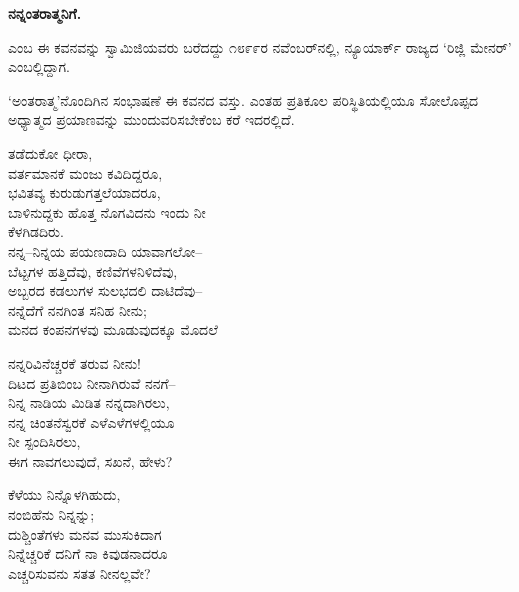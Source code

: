 \begin{myquote}
\end{myquote}

\selectkan

\begin{center}
\textbf{ನನ್ನಂತರಾತ್ಮನಿಗೆ.}
\end{center}

 ಎಂಬ ಈ ಕವನವನ್ನು ಸ್ವಾಮಿಜಿಯವರು ಬರೆದದ್ದು ೧೮೯೯ರ ನವೆಂಬರ್‌ನಲ್ಲಿ, ನ್ಯೂಯಾರ್ಕ್ ರಾಜ್ಯದ ‘ರಿಜ್ಲಿ ಮೇನರ್’ ಎಂಬಲ್ಲಿದ್ದಾಗ.

‘ಅಂತರಾತ್ಮ’ನೊಂದಿಗಿನ ಸಂಭಾಷಣೆ ಈ ಕವನದ ವಸ್ತು. ಎಂತಹ ಪ್ರತಿಕೂಲ ಪರಿಸ್ಥಿತಿಯಲ್ಲಿಯೂ ಸೋಲೊಪ್ಪದ ಅಧ್ಯಾತ್ಮದ ಪ್ರಯಾಣವನ್ನು ಮುಂದುವರಿಸಬೇಕೆಂಬ ಕರೆ ಇದರಲ್ಲಿದೆ.

\begin{myquote}
ತಡೆದುಕೋ ಧೀರಾ,\\ವರ್ತಮಾನಕೆ ಮಂಜು ಕವಿದಿದ್ದರೂ,\\ಭವಿತವ್ಯ ಕುರುಡುಗತ್ತಲೆಯಾದರೂ,\\ಬಾಳಿನುದ್ದಕು ಹೊತ್ತ ನೊಗವಿದನು ಇಂದು ನೀ\\ಕೆಳಗಿಡದಿರು.\\ನನ್ನ–ನಿನ್ನಯ ಪಯಣದಾದಿ ಯಾವಾಗಲೋ–\\ಬೆಟ್ಟಗಳ ಹತ್ತಿದೆವು, ಕಣಿವೆಗಳನಿಳಿದೆವು,\\ಅಬ್ಬರದ ಕಡಲುಗಳ ಸುಲಭದಲಿ ದಾಟಿದೆವು–\\ನನ್ನೆದೆಗೆ ನನಗಿಂತ ಸನಿಹ ನೀನು;\\ಮನದ ಕಂಪನಗಳವು ಮೂಡುವುದಕ್ಕೂ ಮೊದಲೆ
\end{myquote}

\begin{myquote}
ನನ್ನರಿವಿನೆಚ್ಚರಕೆ ತರುವ ನೀನು!\\ದಿಟದ ಪ್ರತಿಬಿಂಬ ನೀನಾಗಿರುವೆ ನನಗೆ–\\ನಿನ್ನ ನಾಡಿಯ ಮಿಡಿತ ನನ್ನದಾಗಿರಲು,\\ನನ್ನ ಚಿಂತನೆಸ್ವರಕೆ ಎಳೆಎಳೆಗಳಲ್ಲಿಯೂ\\ನೀ ಸ್ಪಂದಿಸಿರಲು,\\ಈಗ ನಾವಗಲುವುದೆ, ಸಖನೆ, ಹೇಳು?
\end{myquote}

\begin{myquote}
ಕೆಳೆಯು ನಿನ್ನೊಳಗಿಹುದು,\\ನಂಬಿಹೆನು ನಿನ್ನನ್ನು;\\ದುಶ್ಚಿಂತೆಗಳು ಮನವ ಮುಸುಕಿದಾಗ\\ನಿನ್ನೆಚ್ಚರಿಕೆ ದನಿಗೆ ನಾ ಕಿವುಡನಾದರೂ\\ಎಚ್ಚರಿಸುವನು ಸತತ ನೀನಲ್ಲವೇ?
\end{myquote}


